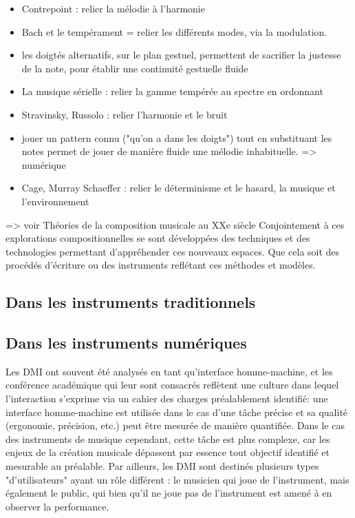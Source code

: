\vspace{-1em}
\begin{itemize}[noitemsep]
\item Contrepoint : relier la mélodie à l'harmonie 
\item Bach et le tempérament = relier les différents modes, via la modulation.
\item les doigtés alternatifs, sur le plan gestuel, permettent de sacrifier la justesse de la note, pour établir une continuité gestuelle fluide
\item La musique sérielle : relier la gamme tempérée au spectre en ordonnant 
\item Stravinsky, Russolo : relier l’harmonie et le bruit 
\item jouer un pattern connu ("qu'on a dans les doigts") tout en substituant les notes permet de jouer de manière fluide une mélodie inhabituelle. => numérique
\item Cage, Murray Schaeffer : relier le déterminisme et le hasard, la musique et l’environnement 
\end{itemize}

=> voir Théories de la composition musicale au XXe siècle 
Conjointement à ces explorations compositionnelles se sont développées des techniques et des technologies permettant d’appréhender ces nouveaux espaces. Que cela soit des procédés d’écriture ou des instruments reflétant ces méthodes et modèles.



\subsection{Dans les instruments traditionnels}

\subsection{Dans les instruments numériques}


Les DMI ont souvent été analysés en tant qu'interface homme-machine, et les conférence académique qui leur sont consacrés reflètent une culture dans lequel l'interaction s'exprime via un cahier des charges préalablement identifié: une interface homme-machine est utilisée dans le cas d'une tâche précise et sa qualité (ergonomie, précision, etc.) peut être mesurée de manière quantifiée.
Dans le cas des instruments de musique cependant, cette tâche est plus complexe, car les enjeux de la création musicale dépassent par essence tout objectif identifié et mesurable au préalable. Par ailleurs, les DMI sont destinés plusieurs types "d'utilisateurs" ayant un rôle différent : le musicien qui joue de l'instrument, mais également le public, qui bien qu'il ne joue pas de l'instrument est amené à en observer la performance.

